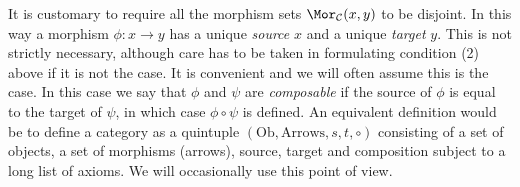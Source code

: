\noindent
It is customary to require all the morphism sets
$\Mor_\mathcal{C}(x, y)$ to be disjoint.
In this way a morphism $\phi : x \to y$ has a unique {\it source} $x$
and a unique {\it target} $y$. This is not strictly necessary,
although care has to be taken in formulating condition (2) above
if it is not the case. It is convenient and we will often assume
this is the case. In this case we say that $\phi$ and $\psi$ are
{\it composable} if the source of $\phi$ is equal to the
target of $\psi$, in which case $\phi \circ \psi$ is defined.
An equivalent definition would be to define a category
as a quintuple $(\text{Ob}, \text{Arrows}, s, t, \circ)$
consisting of a set of objects, a set of morphisms (arrows),
source, target and composition subject to a long list of axioms.
We will occasionally use this point of view.

